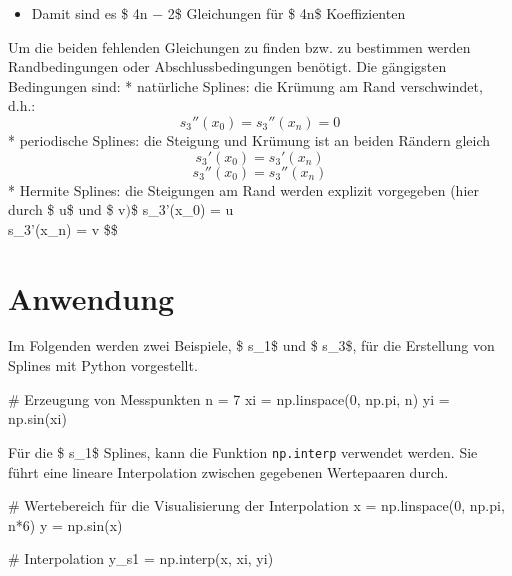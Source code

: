 \documentclass[
  letterpaper,
  DIV=11,
  numbers=noendperiod]{scrreprt}
\newenvironment{Shaded}{\begin{snugshade}}{\end{snugshade}}
\newcommand{\CommentTok}[1]{\textcolor[rgb]{0.37,0.37,0.37}{#1}}
\newcommand{\DecValTok}[1]{\textcolor[rgb]{0.68,0.00,0.00}{#1}}
\newcommand{\NormalTok}[1]{\textcolor[rgb]{0.00,0.23,0.31}{#1}}
\newcommand{\OperatorTok}[1]{\textcolor[rgb]{0.37,0.37,0.37}{#1}}
\providecommand{\tightlist}{%
  \setlength{\itemsep}{0pt}\setlength{\parskip}{0pt}}\usepackage{longtable,booktabs,array}
\begin{document}
\begin{itemize}
\tightlist
\item
  Damit sind es \$ 4n − 2\$ Gleichungen für \$ 4n\$ Koeffizienten
\end{itemize}

Um die beiden fehlenden Gleichungen zu finden bzw. zu bestimmen werden
Randbedingungen oder Abschlussbedingungen benötigt. Die gängigsten
Bedingungen sind: * natürliche Splines: die Krümung am Rand
verschwindet, d.h.: \[ s_3''(x_0) = s_3''(x_n) = 0 \] * periodische
Splines: die Steigung und Krümung ist an beiden Rändern gleich
\[ s_3'(x_0) = s_3'(x_n)\] \[ s_3''(x_0) = s_3''(x_n)\] * Hermite
Splines: die Steigungen am Rand werden explizit vorgegeben (hier durch
\$ u\$ und \$ v\()\)\$ s\_3'(x\_0) = u \[
\] s\_3'(x\_n) = v \$\$

\section{Anwendung}\label{anwendung}

Im Folgenden werden zwei Beispiele, \$ s\_1\$ und \$ s\_3\$, für die
Erstellung von Splines mit Python vorgestellt.

\begin{Shaded}
\begin{Highlighting}[]
\CommentTok{\# Erzeugung von Messpunkten}
\NormalTok{n }\OperatorTok{=} \DecValTok{7}
\NormalTok{xi }\OperatorTok{=}\NormalTok{ np.linspace(}\DecValTok{0}\NormalTok{, np.pi, n)}
\NormalTok{yi }\OperatorTok{=}\NormalTok{ np.sin(xi)}
\end{Highlighting}
\end{Shaded}

Für die \$ s\_1\$ Splines, kann die Funktion \texttt{np.interp}
verwendet werden. Sie führt eine lineare Interpolation zwischen
gegebenen Wertepaaren durch.

\begin{Shaded}
\begin{Highlighting}[]
\CommentTok{\# Wertebereich für die Visualisierung der Interpolation}
\NormalTok{x }\OperatorTok{=}\NormalTok{ np.linspace(}\DecValTok{0}\NormalTok{, np.pi, n}\OperatorTok{*}\DecValTok{6}\NormalTok{)}
\NormalTok{y }\OperatorTok{=}\NormalTok{ np.sin(x)}
\end{Highlighting}
\end{Shaded}

\begin{Shaded}
\begin{Highlighting}[]
\CommentTok{\# Interpolation}
\NormalTok{y\_s1 }\OperatorTok{=}\NormalTok{ np.interp(x, xi, yi)}
\end{Highlighting}
\end{Shaded}
\end{document}
